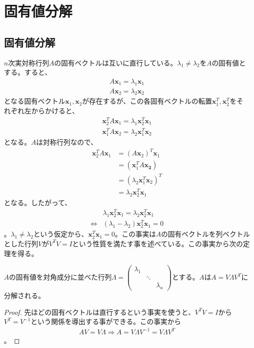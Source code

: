 \section{固有値分解}
\subsection{固有値分解}
$n$次実対称行列$A$の固有ベクトルは互いに直行している。$\lambda_1 \not= \lambda_2$を$A$の固有値とする。すると、
\begin{align*}
  A \mathbf{x}_1 = \lambda_1 \mathbf{x}_1 \\
  A \mathbf{x}_2 = \lambda_2 \mathbf{x}_2
\end{align*}
となる固有ベクトル$\mathbf{x}_1, \mathbf{x}_2$が存在するが、この各固有ベクトルの転置$\mathbf{x}_1^T, \mathbf{x}_2^T$をそれぞれ左からかけると、
\begin{align*}
  \mathbf{x}_2^T A \mathbf{x}_1 = \lambda_1 \mathbf{x}_2^T \mathbf{x}_1 \\
  \mathbf{x}_1^T A \mathbf{x}_2 = \lambda_2 \mathbf{x}_1^T \mathbf{x}_2
\end{align*}
となる。$A$は対称行列なので、
\begin{align*}
  \mathbf{x}_2^T A \mathbf{x}_1 & = (A \mathbf{x}_2)^T \mathbf{x}_1 \\
                                & = (\mathbf{x}_1^T A \mathbf{x_2}) \\
                                & = (\lambda_2 \mathbf{x}_1^T \mathbf{x}_2)^T \\
                                & = \lambda_2 \mathbf{x}_2^T \mathbf{x}_1
\end{align*}
となる。したがって、
\begin{align*}
                  & \lambda_1 \mathbf{x}_2^T \mathbf{x}_1 = \lambda_2 \mathbf{x}_2^T \mathbf{x}_1 \\
  \Leftrightarrow & (\lambda_1 - \lambda_2) \mathbf{x}_2^T \mathbf{x}_1 = 0
\end{align*}
。$\lambda_1 \not= \lambda_2$という仮定から、$\mathbf{x}_2^T \mathbf{x}_1 = 0$。この事実は$A$の固有ベクトルを列ベクトルとした行列$V$が$V^T V = I$という性質を満たす事を述べている。この事実から次の定理を得る。
\begin{theorem*}
  $A$の固有値を対角成分に並べた行列$\Lambda = \displaystyle{\left(\begin{array}{ccc} \lambda_1 & & \\ & \ddots & \\ & & \lambda_n \end{array}\right)}$とする。$A$は$A = V \Lambda V^T$に分解される。
\end{theorem*}
\begin{proof}
  先ほどの固有ベクトルは直行するという事実を使うと、$V^T V = I$から$V^T = V^{-1}$という関係を導出する事ができる。この事実から
  \begin{align*}
    A V = V \Lambda \Rightarrow A = V \Lambda V^{-1} = V \Lambda V^T
  \end{align*}
  。
\end{proof}

